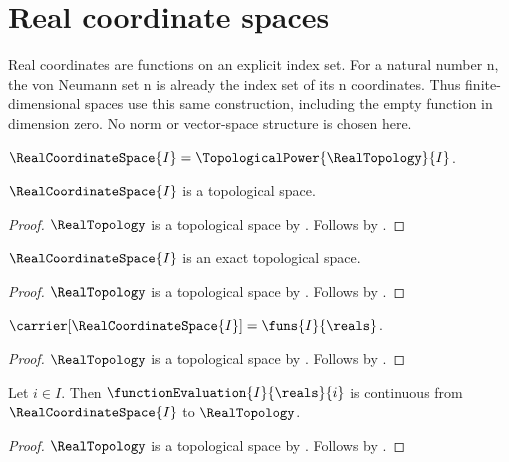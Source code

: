 \section{Real coordinate spaces}





Real coordinates are functions on an explicit index set. For a natural number
n, the von Neumann set n is already the index set of its n coordinates. Thus
finite-dimensional spaces use this same construction, including the empty
function in dimension zero. No norm or vector-space structure is chosen here.

\begin{definition}\label{real_coordinate_space}
    $\RealCoordinateSpace{I}=\TopologicalPower{\RealTopology}{I}$.
\end{definition}

\begin{classification}\label{real_coordinate_space_is_topological_space}
    $\RealCoordinateSpace{I}$ is a topological space.
\end{classification}
\begin{proof}
    $\RealTopology$ is a topological space by .
    Follows by .
\end{proof}

\begin{theorem}\label{real_coordinate_space_is_exact}
    $\RealCoordinateSpace{I}$ is an exact topological space.
\end{theorem}
\begin{proof}
    $\RealTopology$ is a topological space by .
    Follows by .
\end{proof}

\begin{proposition}\label{real_coordinate_space_carrier}
    $\carrier[\RealCoordinateSpace{I}]=\funs{I}{\reals}$.
\end{proposition}
\begin{proof}
    $\RealTopology$ is a topological space by .
    Follows by .
\end{proof}

\begin{theorem}\label{real_coordinate_evaluation_continuous}
    Let $i\in I$.
    Then $\functionEvaluation{I}{\reals}{i}$ is continuous from
        $\RealCoordinateSpace{I}$ to $\RealTopology$.
\end{theorem}
\begin{proof}
    $\RealTopology$ is a topological space by .
    Follows by .
\end{proof}

